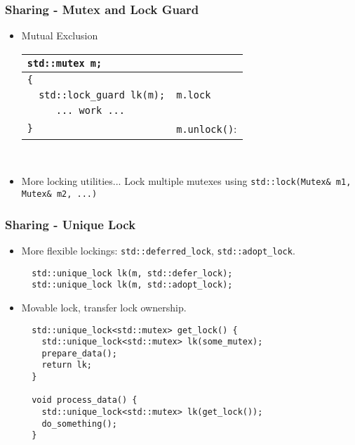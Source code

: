 \documentclass{beamer}
\begin{document}
\begin{frame}[fragile]
  \frametitle{Sharing - Mutex and Lock Guard}
  \begin{itemize}
  \item Mutual Exclusion
    \pause
    \begin{tabular}{l|l}
      \verb|std::mutex m;|&\\
      \hline
      \verb|{|&\\
      \hline
      \verb|  std::lock_guard lk(m);|&\verb|m.lock|\\
      \hline
      \verb|     ... work ...|&\\
      \hline
      \verb|}|&\verb|m.unlock()|:
    \end{tabular}\\
    \pause
  \item More locking utilities...
    Lock multiple mutexes using \verb|std::lock(Mutex& m1, Mutex& m2, ...)|
  \end{itemize}
\end{frame}

\begin{frame}[fragile]
  \frametitle{Sharing - Unique Lock}
  \pause
  \begin{itemize}
  \item More flexible lockings: \verb|std::deferred_lock|, \verb|std::adopt_lock|.
{\scriptsize
\begin{verbatim}
  std::unique_lock lk(m, std::defer_lock);
  std::unique_lock lk(m, std::adopt_lock);
\end{verbatim}
}
\pause
\item Movable lock, transfer lock ownership.
{\scriptsize
\begin{verbatim}
  std::unique_lock<std::mutex> get_lock() {
    std::unique_lock<std::mutex> lk(some_mutex);
    prepare_data();
    return lk;
  }

  void process_data() {
    std::unique_lock<std::mutex> lk(get_lock());
    do_something();
  }
\end{verbatim}
}
  \end{itemize}
\end{frame}
\end{document}
